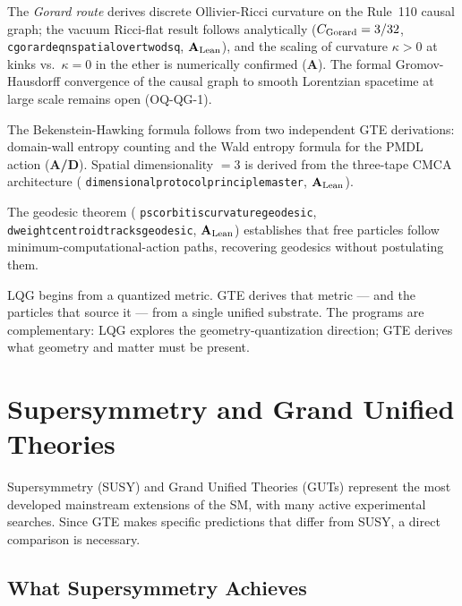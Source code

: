 \documentclass[11pt,openany]{book}
\theoremstyle{remark}
\newcommand{\lean}[1]{%
  \penalty-100
  \begingroup\def\_{\textunderscore\allowbreak}\texttt{#1}\endgroup}
\newcommand{\CatA}{\textbf{A}}
\newcommand{\CatAL}{\ensuremath{\textbf{A}_{\rm Lean}}}
\newcommand{\CatAD}{\textbf{A/D}}
\begin{document}
The \emph{Gorard route} derives discrete Ollivier-Ricci curvature on the Rule~110 causal
graph; the vacuum Ricci-flat result follows analytically ($C_{\rm Gorard} = 3/32$,
\lean{c\_gorard\_eq\_n\_spatial\_over\_two\_dsq}, \CatAL), and the scaling of curvature
$\kappa > 0$ at kinks vs.\ $\kappa = 0$ in the ether is numerically confirmed (\CatA).
The formal Gromov-Hausdorff convergence of the causal graph to smooth Lorentzian
spacetime at large scale remains open (OQ-QG-1).

The Bekenstein-Hawking formula follows from two independent GTE derivations: domain-wall
entropy counting and the Wald entropy formula for the PMDL action (\CatAD).  Spatial
dimensionality $= 3$ is derived from the three-tape CMCA architecture
(\lean{dimensional\_protocol\_principle\_master}, \CatAL).

The geodesic theorem (\lean{psc\_orbit\_is\_curvature\_geodesic},
\lean{dweight\_centroid\_tracks\_geodesic}, \CatAL) establishes that free particles follow
minimum-computational-action paths, recovering geodesics without postulating them.

LQG begins from a quantized metric.  GTE derives that metric — and the particles that
source it — from a single unified substrate.  The programs are complementary: LQG
explores the geometry-quantization direction; GTE derives what geometry and matter must
be present.

\section{Supersymmetry and Grand Unified Theories}
\label{sec:susy_gut}

Supersymmetry (SUSY) and Grand Unified Theories (GUTs) represent the most developed
mainstream extensions of the SM, with many active experimental searches.  Since GTE
makes specific predictions that differ from SUSY, a direct comparison is necessary.

\subsection*{What Supersymmetry Achieves}
\end{document}

